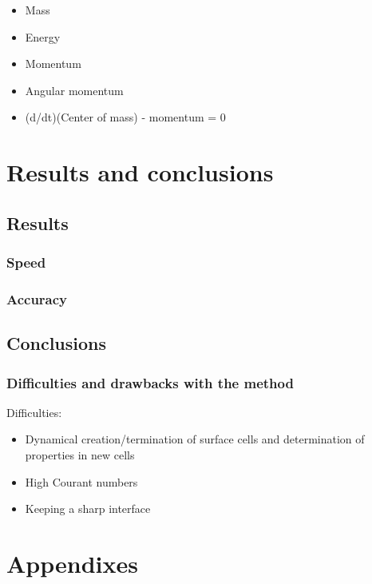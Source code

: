 \documentclass[]{report}
\begin{document}
\begin{itemize}
    \item Mass
    \item Energy
    \item Momentum
    \item Angular momentum
    \item (d/dt)(Center of mass) - momentum = 0
\end{itemize}


\part{Results and conclusions}

\chapter{Results}

\section{Speed}

\section{Accuracy}

\chapter{Conclusions}

\section{Difficulties and drawbacks with the method}

Difficulties:
\begin{itemize}
    \item Dynamical creation/termination of surface cells and determination of properties in new cells
    \item High Courant numbers
    \item Keeping a sharp interface
\end{itemize}


\part{Appendixes}
\end{document}
